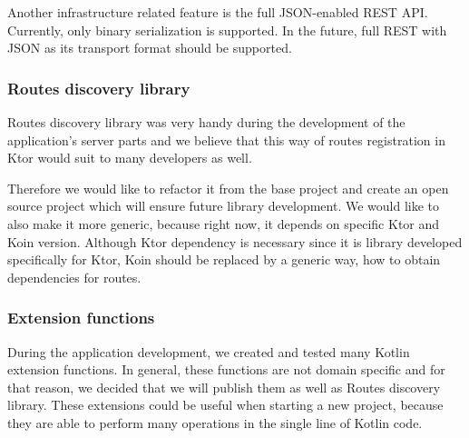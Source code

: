 Another infrastructure related feature is the full JSON-enabled REST API.
Currently, only binary serialization is supported.
In the future, 
full REST with JSON as its transport format should be supported.

\subsubsection{Routes discovery library}
Routes discovery library was very handy during the development of the application's server parts 
and we believe that this way of routes registration in Ktor would suit to many developers as well.

Therefore we would like to refactor it from the base project 
and create an open source project which will ensure future library development.
We would like to also make it more generic,
because right now, 
it depends on specific Ktor and Koin version.
Although Ktor dependency is necessary
since it is library developed specifically for Ktor,
Koin should be replaced by a generic way, 
how to obtain dependencies for routes.

\subsubsection{Extension functions}
During the application development,
we created and tested many Kotlin extension functions.
In general, these functions are not domain specific
and for that reason, we decided that we will publish them as well as Routes discovery library.
These extensions could be useful when starting a new project,
because they are able to perform many operations in the single line of Kotlin code.